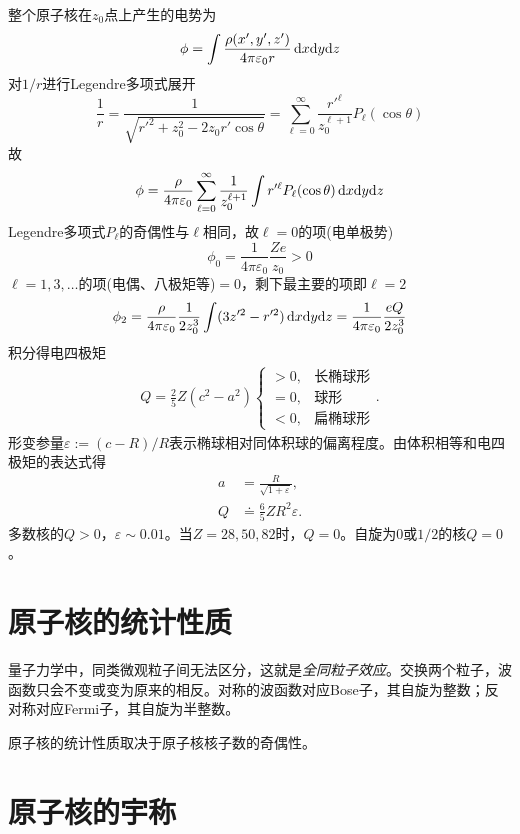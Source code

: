 整个原子核在$z_0$点上产生的电势为
\[
	\phi = \int\frac{\rho(x',y',z')}{4\pi\varepsilon_0r}\mathop{}\!\mathrm{d} x\mathrm{d} y\mathrm{d} z
\]
对$1/r$进行Legendre多项式展开
\[
	\frac1r = \frac1{\sqrt{r'^2 + z_0^2 - 2z_0r'\cos\theta}} = \sum_{\ell=0}^\infty \frac{r'^\ell}{z_0^{\ell+1}}P_\ell(\cos\theta)
\]
故
\[
	\phi = \frac\rho{4\pi\varepsilon_0}\sum_{\ell=0}^\infty\frac1{z_0^{\ell+1}}\int r'^\ell P_\ell(\cos\theta)\mathop{}\!\mathrm{d} x\mathrm{d} y\mathrm{d} z
\]
Legendre多项式$P_\ell$的奇偶性与$\ell$相同，故$\ell = 0$的项(电单极势)
\[
	\phi_0 = \frac1{4\pi\varepsilon_0}\frac{Ze}{z_0} > 0
\]
$\ell = 1,3,\ldots$的项(电偶、八极矩等)$= 0$，剩下最主要的项即$\ell = 2$
\begin{equation}\label{eq:nrd-quadrupole-potential}
	\phi_2 = \frac\rho{4\pi\varepsilon_0}\frac1{2z_0^3}\int(3z'^2 - r'^2)\mathop{}\!\mathrm{d} x\mathrm{d} y\mathrm{d} z = \frac1{4\pi\varepsilon_0}\frac{eQ}{2z_0^3}
\end{equation}
积分得电四极矩
\begin{align}
	Q = \frac25Z(c^2 - a^2)\begin{cases}
		> 0,&\text{长椭球形}\\
		= 0,&\text{球形}\\
		< 0,&\text{扁椭球形}
	\end{cases}.
\end{align}
形变参量$\varepsilon := (c - R)/R$表示椭球相对同体积球的偏离程度。由体积相等和电四极矩的表达式得
\begin{subequations}\label{eq:nrd-quadrupole-deformation}
	\begin{align}
		a &= \frac{R}{\sqrt{1 + \varepsilon}},\\
		Q &\doteq \frac65ZR^2\varepsilon.
	\end{align}
\end{subequations}
多数核的$Q > 0$，$\varepsilon \sim 0.01$。当$Z = 28,50,82$时，$Q = 0$。自旋为0或$1/2$的核$Q = 0$。

\section{原子核的统计性质}

量子力学中，同类微观粒子间无法区分，这就是\textit{全同粒子效应}。交换两个粒子，波函数只会不变或变为原来的相反。对称的波函数对应Bose子，其自旋为整数；反对称对应Fermi子，其自旋为半整数。

原子核的统计性质取决于原子核核子数的奇偶性。

\section{原子核的宇称}

